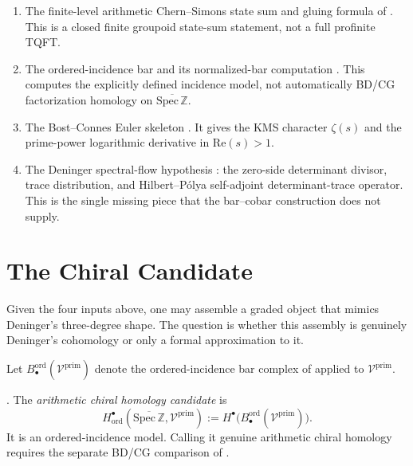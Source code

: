 \begin{enumerate}
\item The finite-level arithmetic Chern--Simons state sum and gluing
formula of . This is a
closed finite groupoid state-sum statement, not a full profinite TQFT.
\item The ordered-incidence bar
 and its normalized-bar computation
. This computes the explicitly
defined incidence model, not automatically BD/CG factorization
homology on \(\overline{\mathrm{Spec}\,\mathbb Z}\).
\item The Bost--Connes Euler skeleton
. It gives the KMS
character \(\zeta(s)\) and the prime-power logarithmic derivative in
\(\mathrm{Re}(s)>1\).
\item The Deninger spectral-flow hypothesis
: the zero-side determinant
divisor, trace distribution, and Hilbert--P\'olya self-adjoint
determinant-trace operator. This is the single missing piece that the
bar--cobar construction does not supply.
\end{enumerate}

\section{The Chiral Candidate}
\label{v4-arith:w8-a:identification}

Given the four inputs above, one may assemble a graded object that
mimics Deninger's three-degree shape. The question is whether this
assembly is genuinely Deninger's cohomology or only a formal
approximation to it.

Let \(B^{\mathrm{ord}}_\bullet(\mathcal{V}^{\mathrm{prim}})\) denote the
ordered-incidence bar complex of 
applied to \(\mathcal{V}^{\mathrm{prim}}\).

\begin{definition}
\label{v4-arith:w8-a:def:chiral-homology}
\ClaimStatusDefinitional. The \emph{arithmetic chiral homology
candidate} is
\begin{equation}
\label{v4-arith:w8-a:eq:chiral-homology-def}
H^\bullet_{\mathrm{ord}}
(\overline{\mathrm{Spec}\,\mathbb Z},\mathcal{V}^{\mathrm{prim}})
:=
H^\bullet\bigl(
B^{\mathrm{ord}}_\bullet(\mathcal V^{\mathrm{prim}})
\bigr).
\end{equation}
It is an ordered-incidence model. Calling it genuine arithmetic chiral
homology requires the separate BD/CG comparison of
.
\end{definition}

